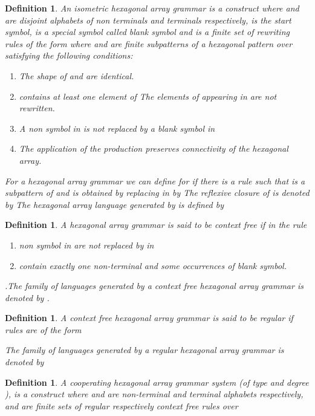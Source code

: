 \documentclass[11pt]{article}
\newtheorem{definition}[theorem]{Definition}
\begin{document}
\begin{definition}An isometric hexagonal array grammar is a construct  where  and  are disjoint
 alphabets of non terminals and terminals respectively,  is the start symbol,  is a special symbol called
 blank symbol and  is a finite set of rewriting rules of the form  where  and 
  are finite subpatterns of a hexagonal pattern over  satisfying the following conditions:
\begin{enumerate}
\item The shape of  and  are identical.
\item  contains at least one element of  The elements of  appearing in  are not rewritten.
\item A non  symbol in  is not replaced by a blank symbol in 
\item The application of the production  preserves connectivity of the hexagonal array.
\end{enumerate}

For a hexagonal array grammar  we can define
 for  if there is a
rule  such that  is a
subpattern of  and  is obtained by replacing  in 
by  The reflexive closure of  is denoted by
 The hexagonal array language generated
by  is defined by


\end{definition}
\begin{definition}A hexagonal array grammar is said to be context free if in the rule 
\begin{enumerate}
\item non  symbol in  are not replaced by  in 
\item  contain exactly one non-terminal and some occurrences of blank symbol.
\end{enumerate}.The family of languages generated by a context
free hexagonal array grammar is denoted by .
\end{definition}
\vspace{5cm }
\begin{definition}A context free hexagonal array grammar is said to be regular if rules are of the form




The family of languages generated by a regular hexagonal array grammar is denoted by 
\end{definition}
\begin{definition}A cooperating hexagonal array grammar system (of type  and degree ), is a construct  where  and  are non-terminal and terminal alphabets respectively,
 and  are finite sets of regular
respectively context free rules over 
\end{definition}
\end{document}
